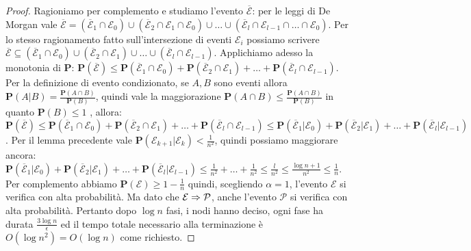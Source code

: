 \documentclass{article}
\begin{document}
\begin{proof}
    Ragioniamo per 
    complemento e studiamo l'evento $\overline{\mathcal{E}}$: per le 
    leggi di De Morgan vale $\overline{\mathcal{E}} = (\overline{\mathcal{E}}_1
    \cap \mathcal{E}_0) \cup (\overline{\mathcal{E}}_2
    \cap \mathcal{E}_1 \cap \mathcal{E}_0) \cup \ldots \cup 
    (\overline{\mathcal{E}}_l \cap \mathcal{E}_{l-1} \cap \ldots
    \cap \mathcal{E}_0)$. Per lo stesso ragionamento fatto sull'intersezione di
    eventi $\mathcal{E}_i$ possiamo scrivere $\overline{\mathcal{E}} \subseteq
    (\overline{\mathcal{E}}_1
    \cap \mathcal{E}_0) \cup (\overline{\mathcal{E}}_2
    \cap \mathcal{E}_1 ) \cup \ldots \cup 
    (\overline{\mathcal{E}}_l \cap \mathcal{E}_{l-1})$. Applichiamo adesso 
    la monotonia di $\mathbf{P}$: $\mathbf{P}(\overline{\mathcal{E}}) \leq
    \mathbf{P}(\overline{\mathcal{E}}_1
    \cap \mathcal{E}_0) + \mathbf{P}(\overline{\mathcal{E}}_2
    \cap \mathcal{E}_1 ) + \ldots + 
    \mathbf{P}(\overline{\mathcal{E}}_l \cap \mathcal{E}_{l-1})$. Per la 
    definizione di evento condizionato, se $A,B$ sono eventi allora $
    \mathbf{P}(A|B) = \frac{\mathbf{P}(A\cap B)}{\mathbf{P}(B)}$, quindi vale 
    la maggiorazione ${\mathbf{P}(A\cap B)} \leq 
    \frac{\mathbf{P}(A\cap B)}{\mathbf{P}(B)}$ in quanto $\mathbf{P}(B) \leq 1$
    , allora: 
    $\mathbf{P}(\overline{\mathcal{E}}) \leq
    \mathbf{P}(\overline{\mathcal{E}}_1
    \cap \mathcal{E}_0) + \mathbf{P}(\overline{\mathcal{E}}_2
    \cap \mathcal{E}_1 ) + \ldots + 
    \mathbf{P}(\overline{\mathcal{E}}_l \cap \mathcal{E}_{l-1}) \leq
    \mathbf{P}(\overline{\mathcal{E}}_1
    | \mathcal{E}_0) + \mathbf{P}(\overline{\mathcal{E}}_2
    | \mathcal{E}_1 ) + \ldots + 
    \mathbf{P}(\overline{\mathcal{E}}_l | \mathcal{E}_{l-1})$. Per il 
    lemma precedente vale $\mathbf{P}(\mathcal{E}_{k+1}|
    \mathcal{E}_{k}) < \frac{1}{n^2}$, quindi possiamo maggiorare ancora:
    $\mathbf{P}(\overline{\mathcal{E}}_1
    | \mathcal{E}_0) + \mathbf{P}(\overline{\mathcal{E}}_2
    | \mathcal{E}_1 ) + \ldots + 
    \mathbf{P}(\overline{\mathcal{E}}_l | \mathcal{E}_{l-1}) \leq 
    \frac{1}{n^2} + \ldots + \frac{1}{n^2} \leq \frac{l}{n^2} \leq 
    \frac{\log{n} + 1}{n^2} \leq \frac{1}{n}$. Per complemento abbiamo 
    $\mathbf{P}(\mathcal{E}) \geq 1 - \frac{1}{n}$ quindi, scegliendo $\alpha
    = 1$, l'evento $\mathcal{E}$ si verifica con alta probabilit\`a. Ma
    dato che $\mathcal{E} \Rightarrow \mathcal{P}$, anche l'evento $
    \mathcal{P}$ si verifica con alta probabilit\`a. Pertanto dopo $\log{n}$
    fasi, i nodi hanno deciso, ogni fase ha durata $\frac{3\log{n}}{\epsilon}$
    ed il tempo totale necessario alla terminazione \`e $O(\log{n}^2) = 
    O(\log{n})$ come richiesto.
\end{proof}
\end{document}

